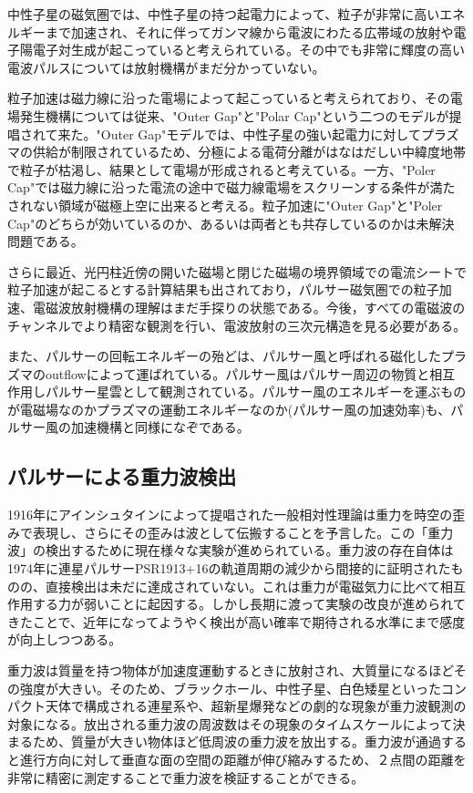 中性子星の磁気圏では、中性子星の持つ起電力によって、粒子が非常に高いエネルギーまで加速され、それに伴ってガンマ線から電波にわたる広帯域の放射や電子陽電子対生成が起こっていると考えられている。その中でも非常に輝度の高い電波パルスについては放射機構がまだ分かっていない。

粒子加速は磁力線に沿った電場によって起こっていると考えられており、その電場発生機構については従来、"Outer Gap"と"Polar Cap"という二つのモデルが提唱されて来た。"Outer Gap"モデルでは、中性子星の強い起電力に対してプラズマの供給が制限されているため、分極による電荷分離がはなはだしい中緯度地帯で粒子が枯渇し、結果として電場が形成されると考えている。一方、"Poler Cap"では磁力線に沿った電流の途中で磁力線電場をスクリーンする条件が満たされない領域が磁極上空に出来ると考える。粒子加速に"Outer Gap"と"Poler Cap"のどちらが効いているのか、あるいは両者とも共存しているのかは未解決問題である。

さらに最近、光円柱近傍の開いた磁場と閉じた磁場の境界領域での電流シートで粒子加速が起こるとする計算結果も出されており，パルサー磁気圏での粒子加速、電磁波放射機構の理解はまだ手探りの状態である。今後，すべての電磁波のチャンネルでより精密な観測を行い、電波放射の三次元構造を見る必要がある。

また、パルサーの回転エネルギーの殆どは、パルサー風と呼ばれる磁化したプラズマのoutflowによって運ばれている。パルサー風はパルサー周辺の物質と相互作用しパルサー星雲として観測されている。パルサー風のエネルギーを運ぶものが電磁場なのかプラズマの運動エネルギーなのか(パルサー風の加速効率)も、パルサー風の加速機構と同様になぞである。


\subsection{パルサーによる重力波検出}

1916年にアインシュタインによって提唱された一般相対性理論は重力を時空の歪みで表現し、さらにその歪みは波として伝搬することを予言した。この「重力波」の検出するために現在様々な実験が進められている。重力波の存在自体は1974年に連星パルサーPSR1913+16の軌道周期の減少から間接的に証明されたものの、直接検出は未だに達成されていない。これは重力が電磁気力に比べて相互作用する力が弱いことに起因する。しかし長期に渡って実験の改良が進められてきたことで、近年になってようやく検出が高い確率で期待される水準にまで感度が向上しつつある。

重力波は質量を持つ物体が加速度運動するときに放射され、大質量になるほどその強度が大きい。そのため、ブラックホール、中性子星、白色矮星といったコンパクト天体で構成される連星系や、超新星爆発などの劇的な現象が重力波観測の対象になる。放出される重力波の周波数はその現象のタイムスケールによって決まるため、質量が大きい物体ほど低周波の重力波を放出する。重力波が通過すると進行方向に対して垂直な面の空間の距離が伸び縮みするため、２点間の距離を非常に精密に測定することで重力波を検証することができる。

